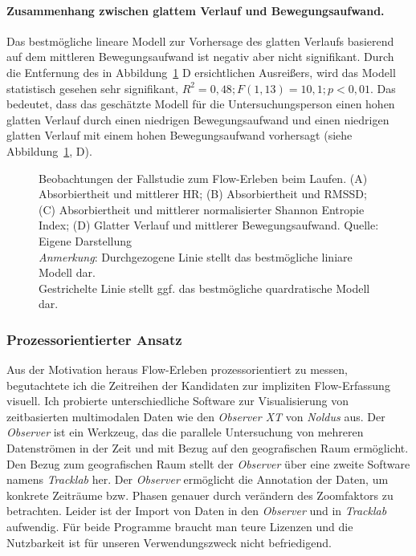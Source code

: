 \paragraph{Zusammenhang zwischen glattem Verlauf und Bewegungsaufwand.}
\label{par:zusammenhang_zwischen_glattem_verlauf_und_bewegungsaufwand}
Das bestmögliche lineare Modell zur Vorhersage des glatten Verlaufs basierend auf dem mittleren Bewegungsaufwand ist negativ aber nicht signifikant. Durch die Entfernung des in Abbildung~\ref{fig:5_8_regression} D ersichtlichen Ausreißers, wird das Modell statistisch gesehen sehr signifikant, $R^2 = 0{,}48; F(1, 13) = 10{,}1; p < 0{,}01$. Das bedeutet, dass das geschätzte Modell für die Untersuchungsperson einen hohen glatten Verlauf durch einen niedrigen Bewegungsaufwand und einen niedrigen glatten Verlauf mit einem hohen Bewegungsaufwand vorhersagt (siehe Abbildung~\ref{fig:5_8_regression}, D).

\begin{figure}
	
	\caption[Beobachtungen der Fallstudie zum Flow-Erleben beim Laufen]{Beobachtungen der Fallstudie zum Flow-Erleben beim Laufen. (A) Absorbiertheit und mittlerer HR; (B) Absorbiertheit und RMSSD; (C) Absorbiertheit und mittlerer normalisierter Shannon Entropie Index; (D) Glatter Verlauf und mittlerer Bewegungsaufwand. Quelle: Eigene Darstellung \\ \hspace{\textwidth}\emph{Anmerkung}: Durchgezogene Linie stellt das bestmögliche liniare Modell dar. \\ \hspace{\textwidth}Gestrichelte Linie stellt ggf. das bestmögliche quardratische Modell dar.}
	\label{fig:5_8_regression}
\end{figure}

\subsubsection{Prozessorientierter Ansatz}
\label{subs:prozessorientierter_ansatz_1}
Aus der Motivation heraus Flow-Erleben prozessorientiert zu messen, begutachtete ich die Zeitreihen der Kandidaten zur impliziten Flow-Erfassung visuell. Ich probierte unterschiedliche Software zur Visualisierung von zeitbasierten multimodalen Daten wie den \emph{Observer XT} von \emph{Noldus} aus. Der \emph{Observer} ist ein Werkzeug, das die parallele Untersuchung von mehreren Datenströmen in der Zeit und mit Bezug auf den geografischen Raum ermöglicht. Den Bezug zum geografischen Raum stellt der \emph{Observer} über eine zweite Software namens \emph{Tracklab} her. Der \emph{Observer} ermöglicht die Annotation der Daten, um konkrete Zeiträume bzw. Phasen genauer durch verändern des Zoomfaktors zu betrachten. Leider ist der Import von Daten in den \emph{Observer} und in \emph{Tracklab} aufwendig. Für beide Programme braucht man teure Lizenzen und die Nutzbarkeit ist für unseren Verwendungszweck nicht befriedigend.

